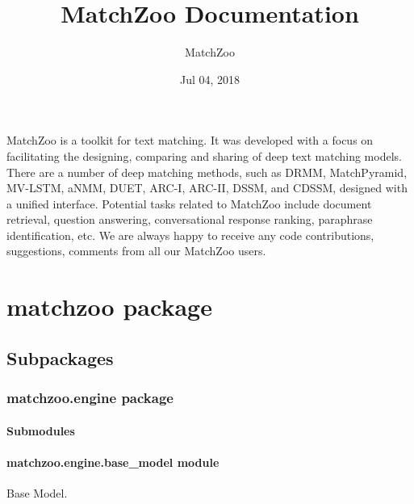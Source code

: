 \documentclass[letterpaper,10pt,english]{sphinxmanual}
\title{MatchZoo Documentation}
\date{Jul 04, 2018}
\author{MatchZoo}
\begin{document}
\maketitle
\sphinxtableofcontents
{}\label{\detokenize{index::doc}}


MatchZoo is a toolkit for text matching. It was developed with a focus on facilitating the designing, comparing and sharing of deep text matching models. There are a number of deep matching methods, such as DRMM, MatchPyramid, MV-LSTM, aNMM, DUET, ARC-I, ARC-II, DSSM, and CDSSM, designed with a unified interface. Potential tasks related to MatchZoo include document retrieval, question answering, conversational response ranking, paraphrase identification, etc. We are always happy to receive any code contributions, suggestions, comments from all our MatchZoo users.


\chapter{matchzoo package}
\label{\detokenize{matchzoo:matchzoo-package}}\label{\detokenize{matchzoo::doc}}\label{\detokenize{matchzoo:welcome-to-matchzoo-s-documentation}}

\section{Subpackages}
\label{\detokenize{matchzoo:subpackages}}

\subsection{matchzoo.engine package}
\label{\detokenize{matchzoo.engine::doc}}\label{\detokenize{matchzoo.engine:matchzoo-engine-package}}

\subsubsection{Submodules}
\label{\detokenize{matchzoo.engine:submodules}}

\subsubsection{matchzoo.engine.base\_model module}
\label{\detokenize{matchzoo.engine:module-matchzoo.engine.base_model}}\label{\detokenize{matchzoo.engine:matchzoo-engine-base-model-module}}
Base Model.
\end{document}
